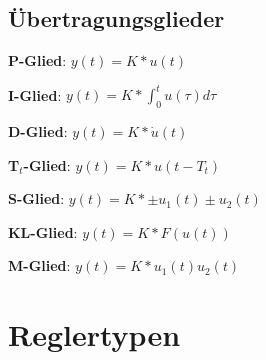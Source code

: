 \subsection{Übertragungsglieder}
\begin{compactitem}
    \item \textbf{P-Glied}: $y(t) = K * u(t)$
    \item \textbf{I-Glied}: $y(t) = K * \int_0^t u(\tau)d\tau$
    \item \textbf{D-Glied}: $y(t) = K * \dot{u}(t)$
    \item \textbf{T$_t$-Glied}: $y(t) = K * u(t-T_t)$
    \item \textbf{S-Glied}: $y(t) = K * \pm u_1(t) \pm u_2(t)$
    \item \textbf{KL-Glied}: $y(t) = K * F(u(t))$
    \item \textbf{M-Glied}: $y(t) = K * u_1(t)u_2(t)$
\end{compactitem}

\section{Reglertypen}
